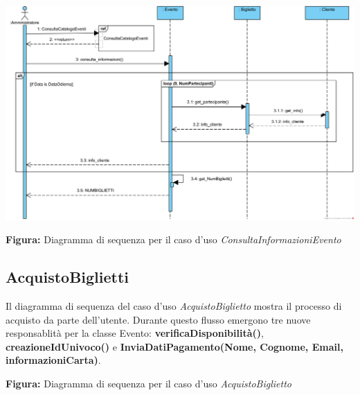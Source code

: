 \begin{center}

    \vspace{2ex}
    \includegraphics[width=0.8\linewidth]{assets/casid'uso/ConsultaInformazioniEvento.png}

    \vspace{1ex}
    \textbf{Figura:} Diagramma di sequenza per il caso d’uso \textit{ConsultaInformazioniEvento}
\end{center}


\newpage
{
\subsection{AcquistoBiglietti}

\begin{center}
Il diagramma di sequenza del caso d’uso \textit{AcquistoBiglietto} mostra il processo di acquisto da parte dell’utente. Durante questo flusso emergono tre nuove responsablità per la classe Evento: \textbf{verificaDisponibilità()}, \textbf{creazioneIdUnivoco()} e \textbf{InviaDatiPagamento(Nome, Cognome, Email, informazioniCarta)}. 
\vspace*{2mm}

\vspace{1ex}
\textbf{Figura:} Diagramma di sequenza per il caso d’uso \textit{AcquistoBiglietto}
\end{center}
}

